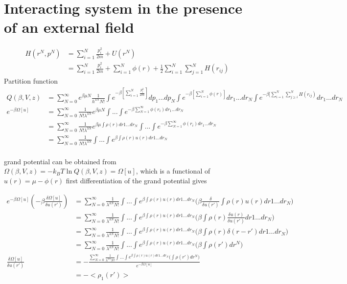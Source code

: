 \documentclass[a4paper]{article}
\begin{document}
\section{Interacting system in the presence of an external field}
\begin{align}
	H(r^N,p^N)& = \sum_{i=1}^{N} \frac{p_i^2}{2m} + U(r^N)\\
	&= \sum_{i=1}^{N} \frac{p_i^2}{2m} + \sum_{i=1}^{N} \phi(r)
	+ \frac{1}{2}\sum_{i=1}^{N} \sum_{j=1}^{N}H(r_{ij})
\end{align}
Partition function
\begin{align}
	Q(\beta,V,z) &= \sum_{N=0}^{\infty} e^{\beta \mu N} \frac{1}{h^{3N}N!} \int e^{-\beta [\sum_{i=1}^{N} \frac{p_i^2}{2m}]} dp_1...dp_N  \int e^{-\beta [\sum_{i=1}^{N} \phi(r)]} dr_1...dr_N \int e^{-\beta [\sum_{i=1}^{N} \sum_{j \ge i}^{N} H(r_{ij})} dr_1...dr_N\\
	e^{-\beta \Omega[u]}&= \sum_{N=0}^{\infty} \frac{1}{N!\lambda^{3N}} e^{\beta \mu N} \int. . .\int e^{-\beta \sum_{N=1}^{\infty}\phi(r_i)dr_1. . .dr_N}\\
	& = \sum_{N=0}^{\infty} \frac{1}{N!\lambda^{3N}} e^{\beta \mu \int\rho(r)dr1...dr_N} \int. . .\int e^{-\beta \sum_{N=1}^{\infty}\phi(r_i)dr_1. . .dr_N}\\
	& = \sum_{N=0}^{\infty} \frac{1}{N!\lambda^{3N}} \int . . . \int e^{\beta \int \rho(r)u(r)dr1...dr_N} \\
\end{align}

grand potential can be obtained from $\Omega(\beta, V, z) = -k_BT \ln Q (\beta, V, z) = \Omega[u]$, which is a functional of  $u(r) = \mu - \phi(r)$
first differentiation of the grand potential gives 

\begin{align}
	e^{-\beta \Omega[u]}(-\beta \frac{\delta \Omega[u]}{\delta u(r')}) &= \sum_{N=0}^\infty \frac{1}{\lambda^{3N}N!} \int . . . \int e^{\beta \int \rho(r)u(r)dr1...dr_N} \big(\beta \frac{\delta}{\delta u(r')} \int \rho(r) u(r) dr1...dr_N\big) \\
	& = \sum_{N=0}^\infty \frac{1}{\lambda^{3N}N!} \int . . . \int e^{\beta \int \rho(r)u(r)dr1...dr_N} \big(\beta \int \rho(r) \frac{\delta u(r)}{\delta u(r')}  dr1...dr_N\big)\\ 
	& = \sum_{N=0}^\infty \frac{1}{\lambda^{3N}N!} \int . . . \int e^{\beta \int \rho(r)u(r)dr1...dr_N} \big(\beta \int \rho(r) \delta(r-r')  dr1...dr_N\big)\\ 
	& = \sum_{N=0}^\infty \frac{1}{\lambda^{3N}N!} \int . . . \int e^{\beta \int \rho(r)u(r)dr1...dr_N} \big(\beta \int \rho(r') dr^N\big)\\ 
	\frac{\delta \Omega[u]}{\delta u(r')}& = - \frac{\sum_{N=0}^\infty \frac{1}{\lambda^{3N}N!} \int . . . \int e^{\beta \int \rho(r)u(r)dr1...dr_N} \big(\int \rho(r') dr^N\big)}{e^{-\beta \Omega[u]}}\\ 
	& = -\big< \rho_1(r')\big>
\end{align}
\end{document}
